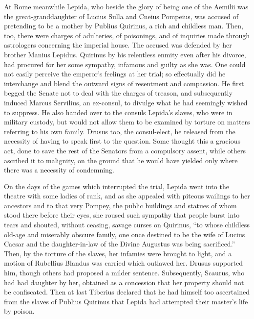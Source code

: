 At Rome meanwhile Lepida, who beside the glory of being one of the Aemilii was the great-granddaughter of Lucius Sulla and Cneius Pompeius, was accused of pretending to be a mother by Publius Quirinus, a rich and childless man. Then, too, there were charges of adulteries, of poisonings, and of inquiries made through astrologers concerning the imperial house. The accused was defended by her brother Manius Lepidus. Quirinus by his relentless enmity even after his divorce, had procured for her some sympathy, infamous and guilty as she was. One could not easily perceive the emperor's feelings at her trial; so effectually did he interchange and blend the outward signs of resentment and compassion. He first begged the Senate not to deal with the charges of treason, and subsequently induced Marcus Servilius, an ex-consul, to divulge what he had seemingly wished to suppress. He also handed over to the consuls Lepida's slaves, who were in military custody, but would not allow them to be examined by torture on matters referring to his own family. Drusus too, the consul-elect, he released from the necessity of having to speak first to the question. Some thought this a gracious act, done to save the rest of the Senators from a compulsory assent, while others ascribed it to malignity, on the ground that he would have yielded only where there was a necessity of condemning.


On the days of the games which interrupted the trial, Lepida went into the theatre with some ladies of rank, and as she appealed with piteous wailings to her ancestors and to that very Pompey, the public buildings and statues of whom stood there before their eyes, she roused such sympathy that people burst into tears and shouted, without ceasing, savage curses on Quirinus, ``to whose childless old-age and miserably obscure family, one once destined to be the wife of Lucius Caesar and the daughter-in-law of the Divine Augustus was being sacrificed.'' Then, by the torture of the slaves, her infamies were brought to light, and a motion of Rubellius Blandus was carried which outlawed her. Drusus supported him, though others had proposed a milder sentence. Subsequently, Scaurus, who had had daughter by her, obtained as a concession that her property should not be confiscated. Then at last Tiberius declared that he had himself too ascertained from the slaves of Publius Quirinus that Lepida had attempted their master's life by poison.


